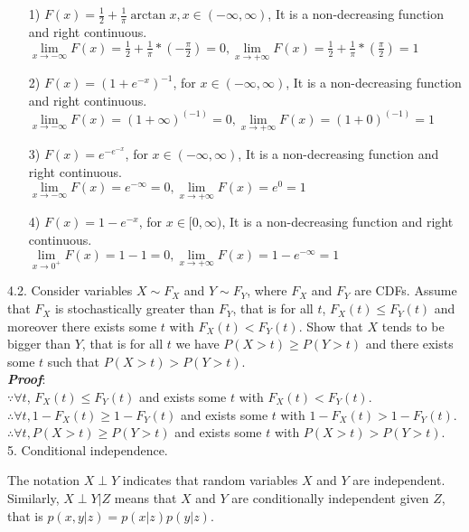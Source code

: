 \documentclass{article}
\theoremstyle{definition}
\theoremstyle{definition}
\theoremstyle{remark}
\begin{document}
\begin{enumerate}
\item[1)] $F(x)=\frac 1 2 + \frac 1 \pi \arctan x, x\in(-\infty,\infty)$, It is a non-decreasing function and right continuous.\\
$\lim\limits_{x \to -\infty }{F(x)} =\frac{1}{2}+\frac{1}{\pi}*(-\frac{\pi}{2})= 0, \lim\limits_{x \to +\infty }{F(x)} =\frac{1}{2}+\frac{1}{\pi}*(\frac{\pi}{2})= 1$
\item[2)] $F(x)=(1+e^{-x})^{-1}$, for $x\in(-\infty,\infty)$, It is a non-decreasing function and right continuous.\\
$\lim\limits_{x \to -\infty }{F(x)} =(1+\infty)^(-1)= 0, \lim\limits_{x \to +\infty }{F(x)} =(1+0)^(-1)= 1$
\item[3)] $F(x)=e^{-e^{-x}}$, for $x\in(-\infty,\infty)$, It is a non-decreasing function and right continuous.\\
$\lim\limits_{x \to -\infty }{F(x)} =e^{-\infty}= 0, \lim\limits_{x \to +\infty }{F(x)} =e^{0}= 1$
\item[4)] $F(x)=1-e^{-x}$, for $x\in[0,\infty)$, It is a non-decreasing function and right continuous.\\
$\lim\limits_{x \to 0^+ }{F(x)} =1-1= 0, \lim\limits_{x \to +\infty }{F(x)} =1-e^{-\infty}= 1$
\end{enumerate}

4.2. Consider variables $X\sim F_X$ and $Y\sim F_Y$, where $F_X$ and $F_Y$ are CDFs. Assume that $F_X$ is stochastically greater than $F_Y$, that is for all $t$,
$F_X(t) \leq F_Y(t)$ and moreover there exists some $t$ with $F_X(t) < F_Y(t)$. Show that $X$ tends to be bigger than $Y$, that is
for all $t$ we have $P(X>t)\geq P(Y>t)$ and there exists some $t$ such that $P(X>t)> P(Y>t)$.\\
\emph{\textbf{Proof}}:\\
$\because \forall t$, $F_X(t) \leq F_Y(t)$ and exists some $t$ with $F_X(t) < F_Y(t)$.\\
$\therefore \forall t, 1- F_X(t) \geq 1-F_Y(t)$ and exists some $t$ with $1-F_X(t) > 1-F_Y(t)$.\\
$\therefore \forall t, P(X>t) \geq P(Y>t)$ and exists some $t$ with $P(X>t) > P(Y>t)$.\\


5. Conditional independence.

The notation $X\perp Y$ indicates that random variables $X$ and $Y$ are independent. Similarly, $X\perp Y|Z$ means that $X$ and $Y$ are conditionally independent given $Z$,
that is $p(x,y|z)=p(x|z)p(y|z)$.
\end{document}

